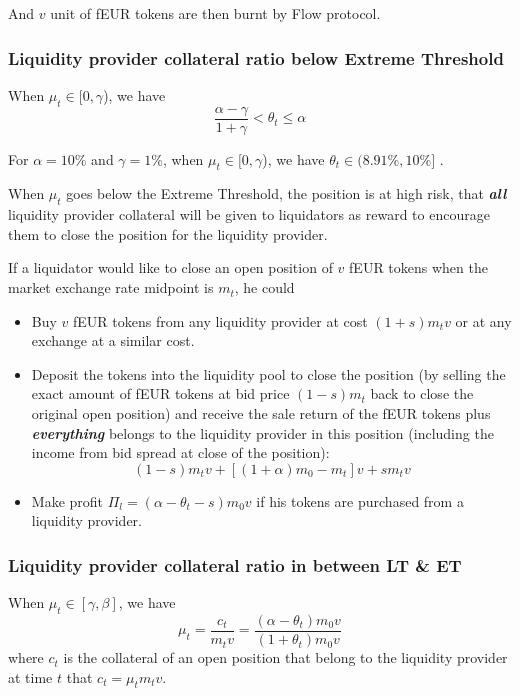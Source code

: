 \documentclass{article}
\begin{document}
And $v$ unit of fEUR tokens are then burnt by Flow protocol.

\subsubsection{Liquidity provider collateral ratio below Extreme Threshold}
When  $\mu_t\in [0,\gamma$), we have
$$\frac{\alpha - \gamma}{1+ \gamma}<\theta_t \leq \alpha$$

For $\alpha = 10\%$ and $\gamma = 1\%$, when $\mu_t\in [0,\gamma$), we have $\theta_t \in (8.91\%, 10\%]$ .

When $\mu_t$ goes below the Extreme Threshold, the position is at high risk, that \textbf{\textit{all}} liquidity provider collateral will be given to liquidators as reward to encourage them to close the position for the liquidity provider.\par

If a liquidator would like to close an open position of $v$ fEUR tokens when the market exchange rate midpoint is $m_t$, he could

\begin{itemize}

    \item Buy $v$ fEUR tokens from any liquidity provider at cost $(1+s)m_t v$ or at any exchange at a similar cost. 
    
    \item Deposit the tokens into the liquidity pool to close the position (by selling the exact amount of fEUR tokens at bid price $(1-s)m_t$ back to close the original open position) and receive the sale return of the fEUR tokens plus \textbf{\textit{everything}} belongs to the liquidity provider in this position (including the income from bid spread at close of the position):
    $$(1-s)m_t v + [(1+\alpha)m_0 - m_t]v + s m_t v$$
    
    \item Make profit $\Pi_l=(\alpha - \theta_t - s)m_0 v$ if his tokens are purchased from a liquidity provider.

\end{itemize}


\subsubsection{Liquidity provider collateral ratio in between LT \& ET}
When $\mu_t \in [\gamma,\beta]$, we have
$$\mu_t=\frac{c_t}{m_t v}=\frac{(\alpha - \theta_t)m_0 v}{(1+\theta_t)m_0 v}$$
where $c_t$ is the collateral of an open position that belong to the liquidity provider at time $t$ that $c_t=\mu_t m_t v$. 
\end{document}
